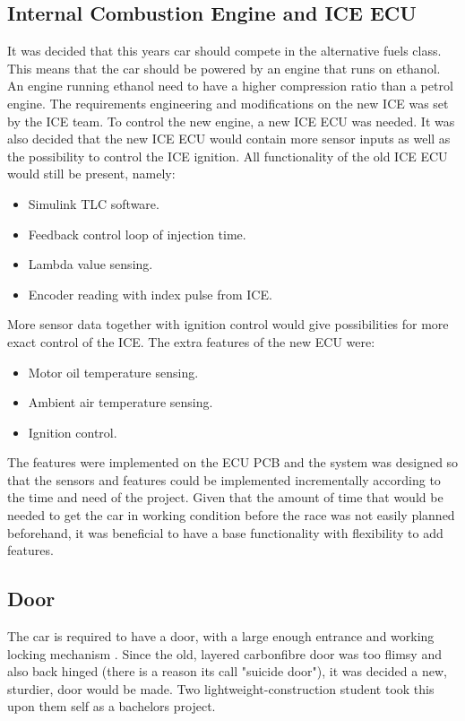 \subsection{Internal Combustion Engine and ICE ECU}
It was decided that this years car should compete in the alternative fuels
class. This means that the car should be powered by an engine that runs on
ethanol. An engine running ethanol need to have a higher compression ratio than
a petrol engine.
The requirements engineering and modifications on the new ICE was set by the ICE
team. To control the new engine, a new ICE ECU was needed. It was also decided
that the new ICE ECU would contain more sensor inputs as well as the possibility
to control the ICE ignition. All functionality of the old ICE ECU would still be
present, namely:
\begin{itemize}
    \item Simulink TLC software.
    \item Feedback control loop of injection time.
    \item Lambda value sensing.
    \item Encoder reading with index pulse from ICE\@.
\end{itemize}
More sensor data together with ignition control would give possibilities
for more exact control of the ICE\@. The extra features of the new ECU were:
\begin{itemize}
    \item Motor oil temperature sensing.
    \item Ambient air temperature sensing.
    \item Ignition control.
\end{itemize}
The features were implemented on the ECU PCB and the system was designed so that
the sensors and features could be implemented incrementally according to the
time and need of the project. Given that the amount of time that would be needed
to get the car in working condition before the race was not easily planned
beforehand, it was beneficial to have a base functionality with flexibility to
add features.

\subsection{Door}
The car is required to have a door, with a large enough entrance and working locking mechanism \cite{semrules16c1}. Since the old, layered carbonfibre door was too flimsy and also back hinged (there is a reason its call "suicide door"), it was decided a new, sturdier, door would be made. Two lightweight-construction student took this upon them self as a bachelors project. 

